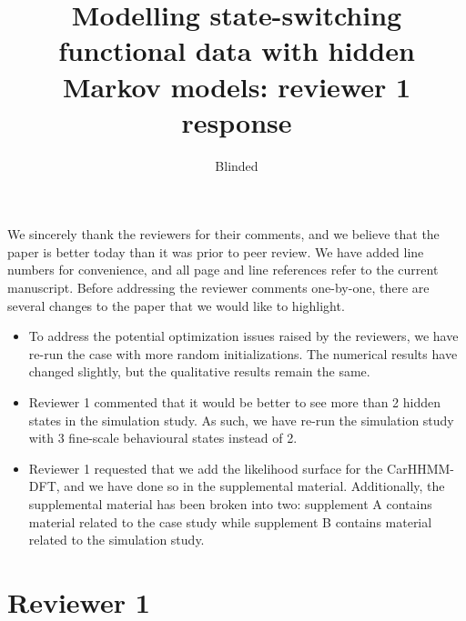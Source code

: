 \documentclass{article}
\begin{document}
\title{Modelling state-switching functional data with hidden Markov models: reviewer 1 response}
\date{}
\author{Blinded}

\maketitle

We sincerely thank the reviewers for their comments, and we believe that the paper is better today than it was prior to peer review. We have added line numbers for convenience, and all page and line references refer to the current manuscript. Before addressing the reviewer comments one-by-one, there are several changes to the paper that we would like to highlight.

\begin{itemize}
    \item To address the potential optimization issues raised by the reviewers, we have re-run the case with more random initializations. The numerical results have changed slightly, but the qualitative results remain the same.
    \item Reviewer 1 commented that it would be better to see more than 2 hidden states in the simulation study. As such, we have re-run the simulation study with 3 fine-scale behavioural states instead of 2.
    \item Reviewer 1 requested that we add the likelihood surface for the CarHHMM-DFT, and we have done so in the supplemental material. Additionally, the supplemental material has been broken into two: supplement A contains material related to the case study while supplement B contains material related to the simulation study. 
\end{itemize}


\section{Reviewer 1}
\end{document}
